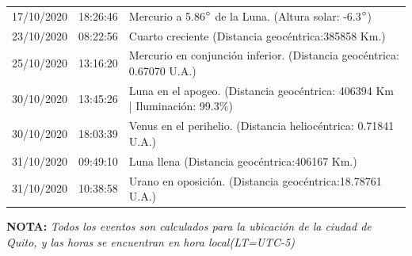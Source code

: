 \documentclass[12pt,a4paper,oneside]{article}
\begin{document}
\begin{center}
\begin{tabular}{ |l| l| l| }
17/10/2020 &  18:26:46   &  Mercurio a 5.86$\degree$ de la Luna. (Altura solar: -6.3$\degree$)	  \\ 
23/10/2020 &  08:22:56   &  Cuarto creciente (Distancia geocéntrica:385858 Km.)	  \\
25/10/2020 &  13:16:20   &  Mercurio en conjunción inferior. (Distancia geocéntrica: 0.67070 U.A.)	  \\
30/10/2020 &  13:45:26   &  Luna en el apogeo. (Distancia geocéntrica: 406394 Km | Iluminación: 99.3\%)	  \\
30/10/2020 &  18:03:39   &  Venus en el perihelio. (Distancia heliocéntrica: 0.71841 U.A.)	  \\
31/10/2020 &  09:49:10   &  Luna llena (Distancia geocéntrica:406167 Km.)	  \\
31/10/2020 &  10:38:58   &  Urano en oposición. (Distancia geocéntrica:18.78761 U.A.)	  \\
\hline
\end{tabular}
\end{center}
\vspace{1cm}
\textbf{NOTA:  }\textit{Todos los eventos son calculados para la ubicaci\'on de la ciudad de Quito, y las horas se encuentran en hora local(LT=UTC-5)}
\vspace{0.7cm}
\newpage
\end{document}
